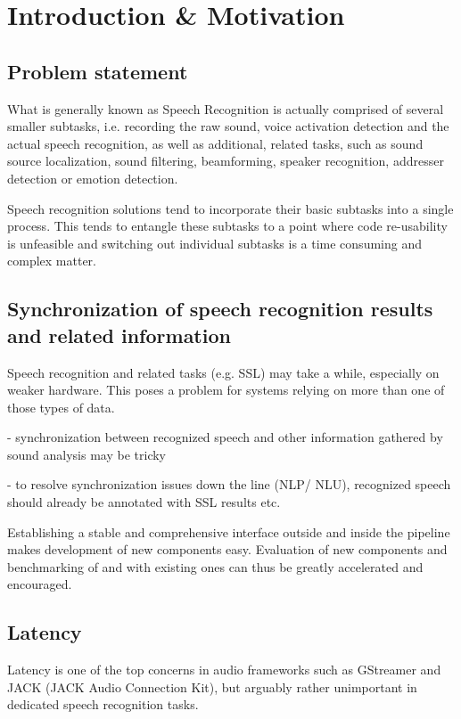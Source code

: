 
\chapter{Introduction \& Motivation}

\section{Problem statement} 
What is generally known as Speech Recognition is actually comprised of several smaller subtasks, i.e. recording the raw sound, voice activation detection and the actual speech recognition, as well as additional, related tasks, such as sound source localization, sound filtering, beamforming, speaker recognition, addresser detection or emotion detection. %

Speech recognition solutions tend to incorporate their basic subtasks into a single process.
This tends to entangle these subtasks to a point where code re-usability is unfeasible and switching out individual subtasks is a time consuming and complex matter.

\section{Synchronization of speech recognition results and related information}

Speech recognition and related tasks (e.g. SSL) may take a while, especially on weaker hardware. 
This poses a problem for systems relying on more than one of those types of data. 

- synchronization between recognized speech and other information gathered by sound analysis may be tricky

- to resolve synchronization issues down the line (NLP/ NLU), recognized speech should already be annotated with SSL results etc.

Establishing a stable and comprehensive interface outside and inside the pipeline makes development of new components easy. 
Evaluation of new components and benchmarking of and with existing ones can thus be greatly accelerated and encouraged.%

\section{Latency}
Latency is one of the top concerns in audio frameworks such as GStreamer and JACK (JACK Audio Connection Kit), but arguably rather unimportant in dedicated speech recognition tasks. 
	
